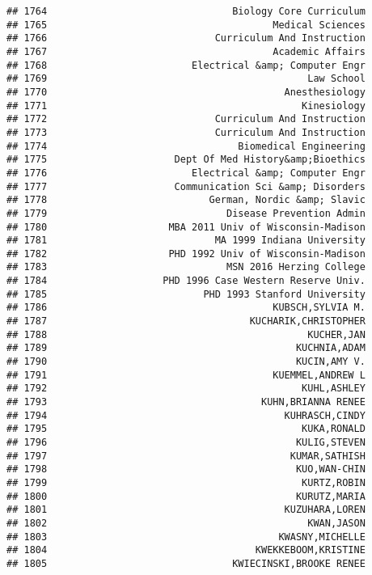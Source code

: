 \documentclass[
]{article}
\begin{document}
\begin{verbatim}
## 1764                                Biology Core Curriculum
## 1765                                       Medical Sciences
## 1766                             Curriculum And Instruction
## 1767                                       Academic Affairs
## 1768                         Electrical &amp; Computer Engr
## 1769                                             Law School
## 1770                                         Anesthesiology
## 1771                                            Kinesiology
## 1772                             Curriculum And Instruction
## 1773                             Curriculum And Instruction
## 1774                                 Biomedical Engineering
## 1775                      Dept Of Med History&amp;Bioethics
## 1776                         Electrical &amp; Computer Engr
## 1777                      Communication Sci &amp; Disorders
## 1778                            German, Nordic &amp; Slavic
## 1779                               Disease Prevention Admin
## 1780                     MBA 2011 Univ of Wisconsin-Madison
## 1781                             MA 1999 Indiana University
## 1782                     PHD 1992 Univ of Wisconsin-Madison
## 1783                               MSN 2016 Herzing College
## 1784                    PHD 1996 Case Western Reserve Univ.
## 1785                           PHD 1993 Stanford University
## 1786                                       KUBSCH,SYLVIA M.
## 1787                                   KUCHARIK,CHRISTOPHER
## 1788                                             KUCHER,JAN
## 1789                                           KUCHNIA,ADAM
## 1790                                           KUCIN,AMY V.
## 1791                                       KUEMMEL,ANDREW L
## 1792                                            KUHL,ASHLEY
## 1793                                     KUHN,BRIANNA RENEE
## 1794                                         KUHRASCH,CINDY
## 1795                                            KUKA,RONALD
## 1796                                           KULIG,STEVEN
## 1797                                          KUMAR,SATHISH
## 1798                                           KUO,WAN-CHIN
## 1799                                            KURTZ,ROBIN
## 1800                                           KURUTZ,MARIA
## 1801                                         KUZUHARA,LOREN
## 1802                                             KWAN,JASON
## 1803                                        KWASNY,MICHELLE
## 1804                                    KWEKKEBOOM,KRISTINE
## 1805                                KWIECINSKI,BROOKE RENEE

\end{verbatim}
\end{document}
